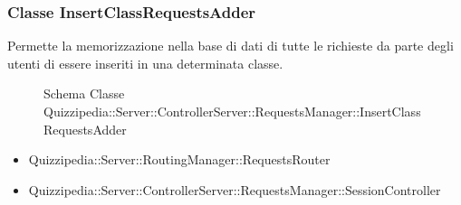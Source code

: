 \subsubsection{Classe InsertClassRequestsAdder}
Permette la memorizzazione nella base di dati di tutte le richieste da parte degli utenti di essere inseriti in una determinata classe.
\begin{figure}[H]
\centering
\noindent{}
\caption{Schema Classe Quizzipedia::Server::ControllerServer::RequestsManager::InsertClassRequestsAdder}
\end{figure}
\begin{itemize}
\item Quizzipedia::Server::RoutingManager::RequestsRouter
\end{itemize}
\begin{itemize}
\item Quizzipedia::Server::ControllerServer::RequestsManager::SessionController
\end{itemize}
